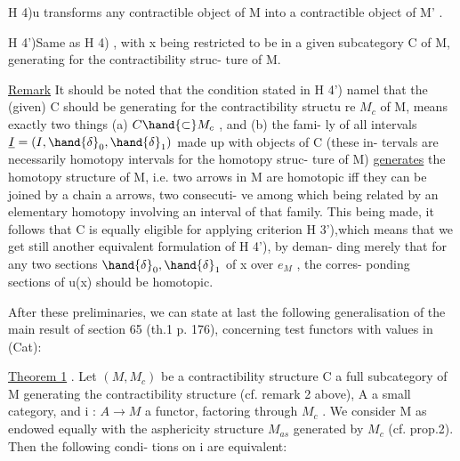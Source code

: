 
H 4)\quad u transforms any contractible object of M into a contractible
object of M' .

H 4')\quad Same as H 4) , with x being restricted to be in a given 
subcategory C of M, generating for the contractibility struc-%
ture of M.

\uline{Remark} It should be noted that the condition stated\deleted{,} in H 4')  namel
that the (given) C should be generating for the contractibility structu%
re $M_c$ of M, means exactly two things (a) $C \hand{\subset} M_c$ , and (b) the fami-%
ly of all intervals $\underline{I} = (I,\hand{\delta}_0,\hand{\delta}_1)$ made up with objects of C (these in-%
tervals are necessarily homotopy intervals for the homotopy struc-%
ture of M) \uline{generates} the homotopy structure of M, i.e. two arrows in M
are homotopic iff they can be joined by a chain a arrows, two consecuti-%
ve among which being related by an elementary homotopy involving an
interval of that family. This  being made, it follows that C
 is equally eligible for applying criterion H 3'),\unsure{,}which means that
 we get still another equivalent formulation of H 4'), by deman-%
ding merely that for any two sections $\hand{\delta}_0,\hand{\delta}_1$ of x over $e_M$ , the corres-%
ponding sections of u(x) should be homotopic.

After these preliminaries, we can state at last 
the following generalisation of the main result of section 65 (th.1
p. 176), concerning test functors with values in (Cat):

\uline{Theorem 1} . Let $(M,M_c)$ be a contractibility structure\deleted{,}\hand{,} C a  full
subcategory of M generating the contractibility structure (cf. remark 2
above), A a small category, and i : $A \longrightarrow M$ a functor, factoring
through $M_c$ . We consider M as endowed equally with the asphericity
structure $M_{as}$ generated by $M_c$ (cf. prop.2). Then the following condi-%
tions on i are equivalent:

